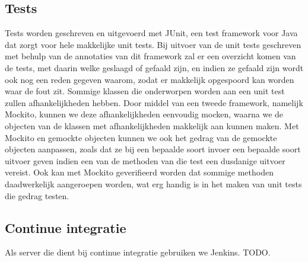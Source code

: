 \documentclass[]{article}
\begin{document}
\subsection{Tests}
Tests worden geschreven en uitgevoerd met JUnit, een test framework voor Java dat zorgt voor hele makkelijke unit tests. Bij uitvoer van de unit tests geschreven met behulp van de annotaties van dit framework zal er een overzicht komen van de tests, met daarin welke geslaagd of gefaald zijn, en indien ze gefaald zijn wordt ook nog een reden gegeven waarom, zodat er makkelijk opgespoord kan worden waar de fout zit. Sommige klassen die onderworpen worden aan een unit test zullen afhankelijkheden hebben. Door middel van een tweede framework, namelijk Mockito, kunnen we deze afhankelijkheden eenvoudig mocken, waarna we de objecten van de klassen met afhankelijkheden makkelijk aan kunnen maken. Met Mockito en gemockte objecten kunnen we ook het gedrag van de gemockte objecten aanpassen, zoals dat ze bij een bepaalde soort invoer een bepaalde soort uitvoer geven indien een van de methoden van die test een dusdanige uitvoer vereist. Ook kan met Mockito geverifieerd worden dat sommige methoden daadwerkelijk aangeroepen worden, wat erg handig is in het maken van unit tests die gedrag testen.
\subsection{Continue integratie}
Als server die dient bij continue integratie gebruiken we Jenkins. TODO.
\end{document}

